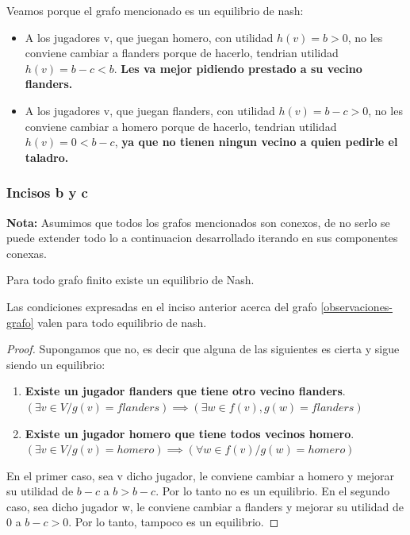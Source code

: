 Veamos porque el grafo mencionado es un equilibrio de nash:
\begin{itemize}
	\item A los jugadores v, que juegan homero, con utilidad $h(v) = b > 0$, no les conviene cambiar a flanders porque de hacerlo, tendrian utilidad $h(v) = b - c < b$. \textbf{Les va mejor pidiendo prestado a su vecino flanders.}
	\item A los jugadores v, que juegan flanders, con utilidad $h(v) = b-c > 0$, no les conviene cambiar a homero porque de hacerlo, tendrian utilidad $h(v) = 0 < b - c$, \textbf{ya que no tienen ningun vecino a quien pedirle el taladro.}
\end{itemize}

\subsubsection{Incisos b y c}
\textbf{Nota:} Asumimos que todos los grafos mencionados son conexos, de no serlo se puede extender todo lo a continuacion desarrollado iterando en sus componentes conexas.\\
\begin{theorem}
	\label{existencia-nash-gfinito}
	Para todo grafo finito existe un equilibrio de Nash.
\end{theorem}

\begin{theorem}
	Las condiciones expresadas en el inciso anterior acerca del grafo \ref{observaciones-grafo} valen para todo equilibrio de nash.	
\end{theorem}
\begin{proof}
	Supongamos que no, es decir que alguna de las siguientes es cierta y sigue siendo un equilibrio:\\
	\begin{enumerate}
		\item \textbf{Existe un jugador flanders que tiene otro vecino flanders}. $(\exists v \in V / g(v) = flanders) \implies (\exists w \in f(v), g(w) = flanders)$ 

		\item \textbf{Existe un jugador homero que tiene todos vecinos homero}. $(\exists v \in V / g(v) = homero) \implies (\forall w \in f(v)/ g(w) = homero)$ 
	\end{enumerate}
	En el primer caso, sea v dicho jugador, le conviene cambiar a homero y mejorar su utilidad de $b-c$ a $b > b-c$. Por lo tanto no es un equilibrio. En el segundo caso, sea dicho jugador w, le conviene cambiar a flanders y mejorar su utilidad de 0 a $b-c >0$. Por lo tanto, tampoco es un equilibrio.
\end{proof}

